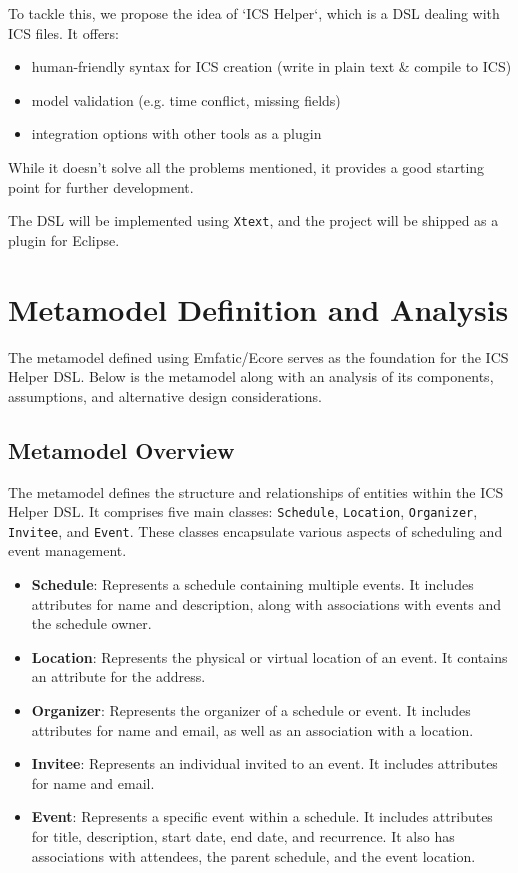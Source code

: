 \documentclass[12pt, letterpaper, twoside]{article}
\begin{document}
To tackle this, we propose the idea of `ICS Helper`, which is a DSL dealing with ICS files. It offers:
    \begin{itemize}
        \item human-friendly syntax for ICS creation (write in plain text & compile to ICS)
        \item model validation (e.g. time conflict, missing fields)
        \item integration options with other tools as a plugin
    \end{itemize}

While it doesn't solve all the problems mentioned, it provides a good starting point for further development.

The DSL will be implemented using \texttt{Xtext}, and the project will be shipped as a plugin for Eclipse.
\newpage
\section{Metamodel Definition and Analysis}

The metamodel defined using Emfatic/Ecore serves as the foundation for the ICS Helper DSL. Below is the metamodel along with an analysis of its components, assumptions, and alternative design considerations.

\subsection{Metamodel Overview}

The metamodel defines the structure and relationships of entities within the ICS Helper DSL. It comprises five main classes: \texttt{Schedule}, \texttt{Location}, \texttt{Organizer}, \texttt{Invitee}, and \texttt{Event}. These classes encapsulate various aspects of scheduling and event management.

\begin{itemize}
    \item \textbf{Schedule}: Represents a schedule containing multiple events. It includes attributes for name and description, along with associations with events and the schedule owner.
    
    \item \textbf{Location}: Represents the physical or virtual location of an event. It contains an attribute for the address.
    
    \item \textbf{Organizer}: Represents the organizer of a schedule or event. It includes attributes for name and email, as well as an association with a location.
    
    \item \textbf{Invitee}: Represents an individual invited to an event. It includes attributes for name and email.
    
    \item \textbf{Event}: Represents a specific event within a schedule. It includes attributes for title, description, start date, end date, and recurrence. It also has associations with attendees, the parent schedule, and the event location.
\end{itemize}
\end{document}

